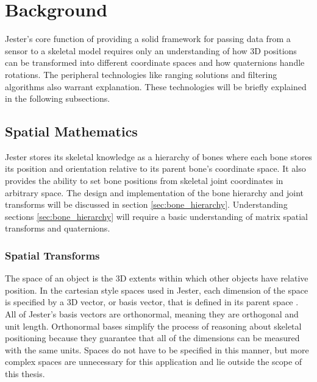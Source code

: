 \chapter{Background}

Jester’s core function of providing a solid framework for passing data from a sensor to a skeletal model requires only an understanding of how 3D positions can be transformed into different coordinate spaces and how quaternions handle rotations. The peripheral technologies like ranging solutions and filtering algorithms also warrant explanation. These technologies will be briefly explained in the following subsections.

\section{Spatial Mathematics}

Jester stores its skeletal knowledge as a hierarchy of bones where each bone stores its position and orientation relative to its parent bone’s coordinate space. It also provides the ability to set bone positions from skeletal joint coordinates in arbitrary space. The design and implementation of the bone hierarchy and joint transforms will be discussed in section \ref{sec:bone_hierarchy}. Understanding sections \ref{sec:bone_hierarchy} will require a basic understanding of matrix spatial transforms and quaternions.

\subsection{Spatial Transforms}

The space of an object is the 3D extents within which other objects have relative position. In the cartesian style spaces used in Jester, each dimension of the space is specified by a 3D vector, or basis vector, that is defined in its parent space \cite{gortler2012foundations}. All of Jester’s basis vectors are orthonormal, meaning they are orthogonal and unit length. Orthonormal bases simplify the process of reasoning about skeletal positioning because they guarantee that all of the dimensions can be measured with the same units. Spaces do not have to be specified in this manner, but more complex spaces are unnecessary for this application and lie outside the scope of this thesis. 

